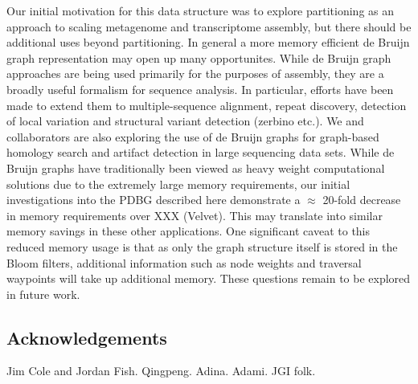 \documentclass[12pt]{article} \usepackage{simplemargins}
\begin{document}
Our initial motivation for this data structure was to explore
partitioning as an approach to scaling metagenome and transcriptome
assembly, but there should be additional uses beyond partitioning. In
general a more memory efficient de Bruijn graph representation may
open up many opportunites.  While de Bruijn graph approaches are being
used primarily for the purposes of assembly, they are a broadly useful
formalism for sequence analysis. In particular, efforts have been made
to extend them to multiple-sequence alignment\cite{zhang2003dna},
repeat discovery\cite{price2005novo}, detection of local variation and
structural variant detection (zerbino etc.).  We and collaborators are
also exploring the use of de Bruijn graphs for graph-based homology
search and artifact detection in large sequencing data sets.  While de
Bruijn graphs have traditionally been viewed as heavy weight
computational solutions due to the extremely large memory
requirements, our initial investigations into the PDBG described here
demonstrate a $\approx$ 20-fold decrease in memory requirements over
XXX (Velvet).  This may translate into similar memory savings in these
other applications.  One significant caveat to this reduced memory
usage is that as only the graph structure itself is stored in the
Bloom filters, additional information such as node weights and
traversal waypoints will take up additional memory.  These questions
remain to be explored in future work.

\subsection{Acknowledgements}

Jim Cole and Jordan Fish.  Qingpeng.  Adina.  Adami.  JGI folk.



\end{document}
